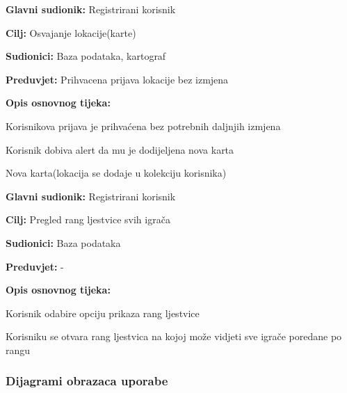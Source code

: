 \noindent {}
\begin{packed_item}
	
	\item \textbf{Glavni sudionik: }Registrirani korisnik
	\item  \textbf{Cilj:} Osvajanje lokacije(karte)
	\item  \textbf{Sudionici:} Baza podataka, kartograf
	\item  \textbf{Preduvjet:} Prihvacena prijava lokacije bez izmjena
	\item  \textbf{Opis osnovnog tijeka:}
	
	\item[] \begin{packed_enum}
		
		\item Korisnikova prijava je prihvaćena bez potrebnih daljnjih izmjena
		\item Korisnik dobiva alert da mu je dodijeljena nova karta
		\item Nova karta(lokacija se dodaje u kolekciju korisnika)
	\end{packed_enum}
\end{packed_item}

\noindent {}
\begin{packed_item}
	
	\item \textbf{Glavni sudionik: }Registrirani korisnik
	\item  \textbf{Cilj:} Pregled rang ljestvice svih igrača
	\item  \textbf{Sudionici:} Baza podataka
	\item  \textbf{Preduvjet:} -
	\item  \textbf{Opis osnovnog tijeka:}
	
	\item[] \begin{packed_enum}
		
		\item Korisnik odabire opciju prikaza rang ljestvice
		\item Korisniku se otvara rang ljestvica na kojoj može vidjeti sve igrače poredane po rangu
	\end{packed_enum}
\end{packed_item}
	
				
					
				\subsubsection{Dijagrami obrazaca uporabe}
					
